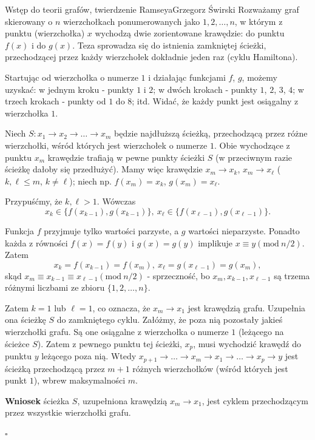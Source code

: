 \begin{referat}{Wstęp do teorii grafów, twierdzenie Ramseya}{Grzegorz Świrski}
Rozważamy graf skierowany o $ n $ wierzchołkach ponumerowanych jako $ 1,2,\ldots,n $, w którym z punktu (wierzchołka) $ x $ wychodzą dwie zorientowane krawędzie: do punktu $ f(x) $ i do $ g(x) $. Teza sprowadza się do istnienia zamkniętej ścieżki, przechodzącej przez każdy wierzchołek dokładnie jeden raz (cyklu Hamiltona).

Startując od wierzchołka o numerze $ 1 $ i działając funkcjami $ f $, $ g $, możemy uzyskać: w jednym kroku - punkty $ 1 $ i $ 2 $; w dwóch krokach - punkty $ 1 $, $ 2 $, $ 3 $, $ 4 $; w trzech krokach - punkty od $ 1 $ do $ 8 $; itd. Widać, że każdy punkt jest osiągalny z wierzchołka $ 1 $.

Niech $ S: x_1 \to x_2 \to \ldots \to x_m $ będzie najdłuższą ścieżką, przechodzącą przez różne wierzchołki, wśród których jest wierzchołek o numerze $ 1 $. Obie wychodzące z punktu $ x_m $ krawędzie trafiają w pewne punkty ścieżki $ S $ (w przeciwnym razie ścieżkę dałoby się przedłużyć). Mamy więc krawędzie $ x_m \to x_k $, $ x_m \to x_\ell $ ($ k,\ell \leq m $, $ k \neq \ell $); niech np. $ f (x_m) = x_k $, $ g(x_m) = x_\ell $.

Przypuśćmy, że $ k,\ell > 1 $. Wówczas
$$ x_k \in \{f (x_{k-1}),g(x_{k-1})\},\  x_\ell \in \{f (x_{\ell-1}),g(x_{\ell-1})\}. $$

Funkcja $ f $ przyjmuje tylko wartości parzyste, a $ g $ wartości nieparzyste. Ponadto każda z równości $ f (x) = f (y) $ i $ g(x) = g(y) $ implikuje $ x \equiv y (\mathrm{mod}\ n/2) $. Zatem $$ x_k=f(x_{k-1})=f(x_m),\ x_\ell=g(x_{\ell-1})=g(x_m), $$ skąd $ x_m \equiv x_{k-1} \equiv x_{\ell-1} (\mathrm{mod}\ n/2) $ - sprzeczność, bo $ x_m, x_{k-1}, x_{\ell- 1} $ są trzema różnymi liczbami ze zbioru $ \{1, 2, \ldots, n\} $.

Zatem $ k = 1 $ lub $ \ell =1 $, co oznacza, że $ x_m \to x_1 $ jest krawędzią grafu. Uzupełnia ona ścieżkę $ S $ do zamkniętego cyklu. Załóżmy, że poza nią pozostały jakieś wierzchołki grafu. Są one osiągalne z wierzchołka o numerze $ 1 $ (leżącego na ścieżce $ S $). Zatem z pewnego punktu tej ścieżki, $ x_p $, musi wychodzić krawędź do punktu $ y $ leżącego poza nią. Wtedy $ x_{p+1} \to \ldots \to x_m \to x_1 \to \ldots \to x_p \to y $ jest ścieżką przechodzącą przez $ m+1 $ różnych wierzchołków (wśród których jest punkt $ 1 $), wbrew maksymalności $ m $.

\textbf{Wniosek} ścieżka $ S $, uzupełniona krawędzią $ x_m \to x_1 $, jest cyklem przechodzącym przez wszystkie wierzchołki grafu.
\begin{flushright}
$\square$
\end{flushright}


\end{referat}
